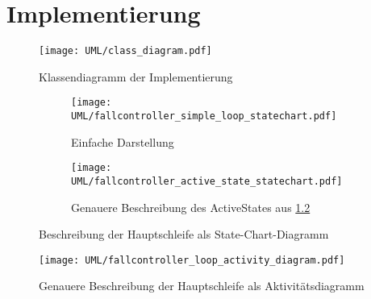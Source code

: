 \chapter{Implementierung}

\begin{figure}[hb] \centering
	\texttt{[image: UML/class\_diagram.pdf]}
	\caption{Klassendiagramm der Implementierung}
	\label{uml:class_diagram}
\end{figure}

\begin{figure}[hb] \centering
	\begin{subfigure}[b]{0.4\textwidth}
		\texttt{[image: UML/fallcontroller\_simple\_loop\_statechart.pdf]}
		\caption{Einfache Darstellung}
		\label{uml:statechart_simleloop}
	\end{subfigure}\hspace{1cm}
	\begin{subfigure}[b]{0.4\textwidth}
 		\texttt{[image: UML/fallcontroller\_active\_state\_statechart.pdf]}
		\caption{Genauere Beschreibung des ActiveStates aus \ref{uml:statechart_simleloop}}
		\label{uml:statechart_activeState}
	\end{subfigure}
	\caption{Beschreibung der Hauptschleife als State-Chart-Diagramm}
	\label{uml:statechart}
\end{figure}

\begin{figure}[hb] \centering
\end{figure}

\begin{figure}[hb] \centering
	\texttt{[image: UML/fallcontroller\_loop\_activity\_diagram.pdf]}
	\caption{Genauere Beschreibung der Hauptschleife als Aktivitätsdiagramm}
	\label{uml:activity_diagram}
\end{figure}



